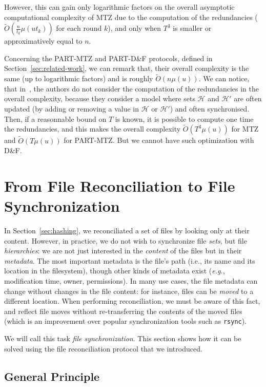 \documentclass{llncs}
\newcommand{\Oapp}{\ensuremath{\tilde{O}}}
\newcommand{\Set}{\mathcal{H}}
\newcommand{\df}{D\&F\xspace}
\newcommand{\rsync}{\texttt{rsync}\xspace}
\newcommand{\eg}{\textit{e.g.}\xspace}
\newcommand{\comm}[1]{\todo{#1}}
\begin{document}
However, this can gain only logarithmic factors on the overall asymptotic computational complexity of MTZ due to the computation of the redundancies ($\Oapp(\frac{n}{t_k} \mu(ut_k))$ for each round $k$), and only when $T^3$ is smaller or approximatively equal to $n$.

Concerning the PART-MTZ and PART-\df protocols, defined in Section~\ref{sec:related-work}, we can remark that, their overall complexity is the same (up to logarithmic factors) and is roughly $\Oapp(n \mu(u))$.
We can notice, that in~\cite{Mins1,PSRec}, the authors do not consider the computation of the redundancies in the overall complexity, because they consider a model where sets $\Set$ and $\Set'$ are often updated (by adding or removing a value in $\Set$ or $\Set'$) and often synchronised.
Then, if a reasonnable bound on $T$ is known, it is possible to compute one time the redundancies, and this makes the overall complexity $\Oapp(T^3 \mu(u))$ for MTZ and $\Oapp(T \mu(u))$ for PART-MTZ.
But we cannot have such optimization with \df.

\comm{TODO: maybe find something more positive ???}



\section{From File Reconciliation to File Synchronization}
\label{sec:files}

In Section~\ref{sec:hashing}, we reconciliated a set of files by looking only at their content.
However, in practice, we do not wish to synchronize file \emph{sets}, but file
\emph{hierarchies}: we are not just interested in the \emph{content} of the
files but in their \emph{metadata}. The most important metadata is the file's
path (i.e., its name and its location in the filesystem), though other kinds of
metadata exist (\eg, modification time, owner, permissions). In many use
cases, the file metadata can change without changes in the file content: for
instance, files can be \emph{moved} to a different location. When performing
reconciliation, we must be aware of this fact, and reflect file moves without
re-transferring the contents of the moved files (which is an improvement over
popular synchronization tools such as \rsync).

We will call this task \emph{file synchronization}. This section shows how it can be solved using the file reconciliation protocol that we introduced.

\subsection{General Principle}
\end{document}
